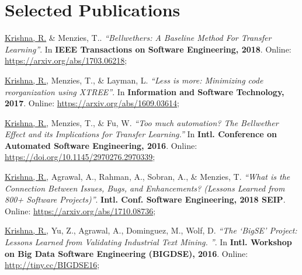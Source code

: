 \documentclass[letterpaper,9pt]{article}
\begin{document}
\section{Selected Publications}
\begin{enumerate}[label={[\arabic*]}, leftmargin=15pt]

    \item\small \underline{Krishna, R.} \& Menzies, T.. \textit{``Bellwethers:
    A Baseline Method For Transfer Learning''}. In \textbf{IEEE Transactions on Software Engineering, 2018}. Online: 
    \href{https://arxiv.org/abs/1703.06218}{https://arxiv.org/abs/1703.06218}\vspace{-6pt};

    \item\small \underline{Krishna, R.}, Menzies, T., \& Layman, L. 
    \textit{``Less is more: Minimizing code reorganization using XTREE''}. In 
    \textbf{Information and Software Technology, 2017}. 
    Online:  
    \href{https://arxiv.org/abs/1609.03614}{https://arxiv.org/abs/1609.03614}\vspace{-6pt};
    
    \item\small  \underline{Krishna, R.}, Menzies, T., \& Fu, W. \textit{``Too
    much automation? The Bellwether Effect and its Implications for Transfer 
    Learning.''} In \textbf{Intl. Conference on Automated Software 
    Engineering, 2016}. Online: 
    \href{https://doi.org/10.1145/2970276.2970339}{https://doi.org/10.1145/2970276.2970339}\vspace{-6pt};
    
    \item\small \underline{Krishna, R.}, Agrawal, A., Rahman, A., Sobran, A., 
    \& Menzies, T. \textit{``What is the Connection Between Issues, Bugs, and 
    Enhancements? (Lessons Learned from 800+ Software Projects)''}. 
    \textbf{Intl. Conf. Software Engineering, 2018 SEIP}. Online: 
    \href{https://arxiv.org/abs/1710.08736}{https://arxiv.org/abs/1710.08736}\vspace{-6pt};
    
    \item\small \underline{Krishna, R.}, Yu, Z., Agrawal, A., Dominguez, M., Wolf, D. \textit{``The `BigSE' Project: Lessons Learned from Validating Industrial Text Mining. ''}. In \textbf{Intl. Workshop on Big Data Software Engineering (BIGDSE), 2016}. Online: \href{http://tiny.cc/BIGDSE16}{http://tiny.cc/BIGDSE16}\vspace{-6pt};


\end{enumerate}
\end{document}
